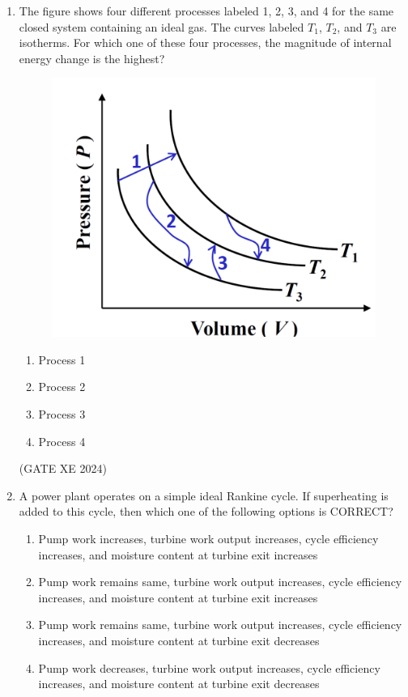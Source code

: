 \documentclass[12pt]{article}
\begin{document}
\begin{enumerate}
(GATE XE 2024)

\item The figure shows four different processes labeled 1, 2, 3, and 4 for the same closed system containing an ideal gas. The curves labeled $T_1$, $T_2$, and $T_3$ are isotherms. For which one of these four processes, the magnitude of internal energy change is the highest?  

\begin{figure}[H]
    \centering
    \includegraphics[width=0.5\columnwidth]{figs/ass5_d_q91.png}
    \caption{}
    \label{fig:placeholder}
\end{figure}

\begin{enumerate}
\item Process 1  
\item Process 2  
\item Process 3  
\item Process 4  
\end{enumerate}

(GATE XE 2024)

\item A power plant operates on a simple ideal Rankine cycle. If superheating is added to this cycle, then which one of the following options is CORRECT?

\begin{enumerate}
\item Pump work increases, turbine work output increases, cycle efficiency increases, and moisture content at turbine exit increases  
\item Pump work remains same, turbine work output increases, cycle efficiency increases, and moisture content at turbine exit increases  
\item Pump work remains same, turbine work output increases, cycle efficiency increases, and moisture content at turbine exit decreases  
\item Pump work decreases, turbine work output increases, cycle efficiency increases, and moisture content at turbine exit decreases  
\end{enumerate}


\end{enumerate}
\end{document}

